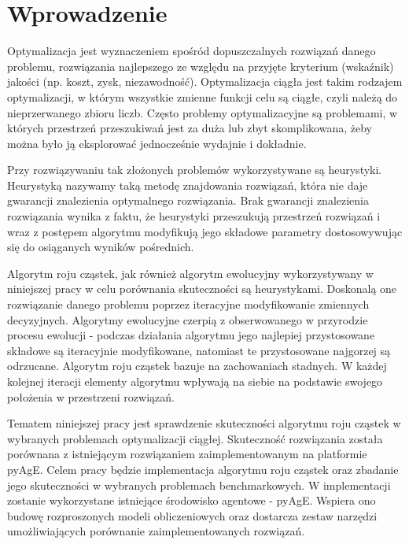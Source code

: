 \chapter{Wprowadzenie}
\label{cha:wstep}


Optymalizacja jest wyznaczeniem spośród dopuszczalnych rozwiązań danego problemu, rozwiązania najlepszego ze względu na przyjęte kryterium (wskaźnik) jakości (np. koszt, zysk, niezawodność). Optymalizacja ciągła jest takim rodzajem optymalizacji, w którym wszystkie zmienne funkcji celu są ciągłe, czyli należą do nieprzerwanego zbioru liczb. Często problemy optymalizacyjne są problemami, w których przestrzeń przeszukiwań jest za duża lub zbyt skomplikowana, żeby można było ją eksplorować jednocześnie wydajnie i dokładnie.

Przy rozwiązywaniu tak złożonych problemów wykorzystywane są heurystyki. Heurystyką nazywamy taką metodę znajdowania rozwiązań, która nie daje gwarancji znalezienia optymalnego rozwiązania. Brak gwarancji znalezienia rozwiązania wynika z faktu, że heurystyki przeszukują przestrzeń rozwiązań i wraz z postępem algorytmu modyfikują jego składowe parametry dostosowywując się do osiąganych wyników pośrednich.

Algorytm roju cząstek, jak również algorytm ewolucyjny wykorzystywany w niniejszej pracy w celu porównania skuteczności są heurystykami. Doskonalą one rozwiązanie danego problemu poprzez iteracyjne modyfikowanie zmiennych decyzyjnych. Algorytmy ewolucyjne czerpią z obserwowanego w przyrodzie procesu ewolucji - podczas działania algorytmu jego najlepiej przystosowane składowe są iteracyjnie modyfikowane, natomiast te przystosowane najgorzej są odrzucane. Algorytm roju cząstek bazuje na zachowaniach stadnych. W każdej kolejnej iteracji elementy algorytmu wpływają na siebie na podstawie swojego położenia w przestrzeni rozwiązań.



Tematem niniejszej pracy jest sprawdzenie skuteczności algorytmu roju cząstek w wybranych problemach optymalizacji ciągłej. Skuteczność rozwiązania została porównana z istniejącym rozwiązaniem zaimplementowanym na platformie pyAgE. Celem pracy będzie implementacja algorytmu roju cząstek oraz zbadanie jego skuteczności w wybranych problemach benchmarkowych. W implementacji zostanie wykorzystane istniejące środowisko agentowe - pyAgE. Wspiera ono budowę rozproszonych modeli obliczeniowych oraz dostarcza zestaw narzędzi umożliwiających porównanie zaimplementowanych rozwiązań.

